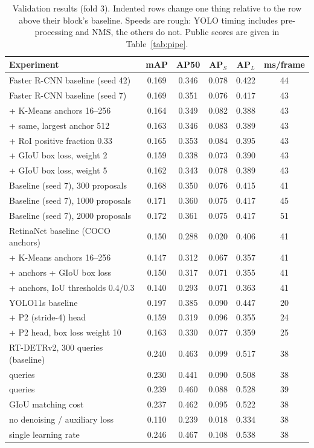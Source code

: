 \documentclass[11pt,a4paper]{article}
\begin{document}
\begin{table}[h]
\centering\footnotesize
\begin{tabular}{lccccc}
\toprule
Experiment & mAP & AP50 & AP$_S$ & AP$_L$ & ms/frame \\
\midrule
Faster R-CNN baseline (seed 42) & 0.169 & 0.346 & 0.078 & 0.422 & 44 \\
Faster R-CNN baseline (seed 7) & 0.169 & 0.351 & 0.076 & 0.417 & 43 \\
\quad + K-Means anchors 16--256 & 0.164 & 0.349 & 0.082 & 0.388 & 43 \\
\quad + same, largest anchor 512 & 0.163 & 0.346 & 0.083 & 0.389 & 43 \\
\quad + RoI positive fraction 0.33 & 0.165 & 0.353 & 0.084 & 0.395 & 43 \\
\quad + GIoU box loss, weight 2 & 0.159 & 0.338 & 0.073 & 0.390 & 43 \\
\quad + GIoU box loss, weight 5 & 0.162 & 0.343 & 0.078 & 0.389 & 43 \\
Baseline (seed 7), 300 proposals & 0.168 & 0.350 & 0.076 & 0.415 & 41 \\
Baseline (seed 7), 1000 proposals & 0.171 & 0.360 & 0.075 & 0.417 & 45 \\
Baseline (seed 7), 2000 proposals & 0.172 & 0.361 & 0.075 & 0.417 & 51 \\
\midrule
RetinaNet baseline (COCO anchors) & 0.150 & 0.288 & 0.020 & 0.406 & 41 \\
\quad + K-Means anchors 16--256 & 0.147 & 0.312 & 0.067 & 0.357 & 41 \\
\quad + anchors + GIoU box loss & 0.150 & 0.317 & 0.071 & 0.355 & 41 \\
\quad + anchors, IoU thresholds 0.4/0.3 & 0.140 & 0.293 & 0.071 & 0.363 & 41 \\
\midrule
YOLO11s baseline & 0.197 & 0.385 & 0.090 & 0.447 & 20 \\
\quad + P2 (stride-4) head & 0.159 & 0.319 & 0.096 & 0.355 & 24 \\
\quad + P2 head, box loss weight 10 & 0.163 & 0.330 & 0.077 & 0.359 & 25 \\
\midrule
RT-DETRv2, 300 queries (baseline) & 0.240 & 0.463 & 0.099 & 0.517 & 38 \\
\quad 100 queries & 0.230 & 0.441 & 0.090 & 0.508 & 38 \\
\quad 500 queries & 0.239 & 0.460 & 0.088 & 0.528 & 39 \\
\quad GIoU matching cost & 0.237 & 0.462 & 0.095 & 0.522 & 38 \\
\quad no denoising / auxiliary loss & 0.110 & 0.239 & 0.018 & 0.334 & 38 \\
\quad single learning rate & 0.246 & 0.467 & 0.108 & 0.538 & 38 \\
\bottomrule
\end{tabular}
\caption{Validation results (fold 3). Indented rows change one thing relative to the row above their block's baseline. Speeds are rough: YOLO timing includes pre-processing and NMS, the others do not. Public scores are given in Table~\ref{tab:pipe}.}
\label{tab:all}
\end{table}
\end{document}

